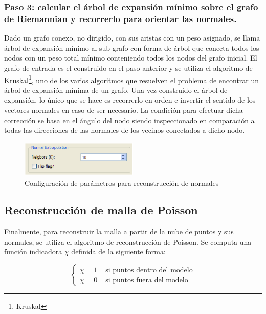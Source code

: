 \subsubsection{Paso 3: calcular el árbol de expansión mínimo sobre el grafo de Riemannian y recorrerlo para orientar las normales.}
Dado un grafo conexo, no dirigido, con sus aristas con un peso asignado, se llama árbol de expansión mínimo al sub-grafo con forma de árbol que conecta todos los nodos con un peso total mínimo conteniendo todos los nodos del grafo inicial. El grafo de entrada es el construido en el paso anterior y se utiliza el algoritmo de Kruskal\footnote{Kruskal}, uno de los varios algoritmos que resuelven el problema de encontrar un árbol de expansión mínima de un grafo.
Una vez construido el árbol de expansión, lo único que se hace es recorrerlo en orden e invertir el sentido de los vectores normales en caso de ser necesario. La condición para efectuar dicha corrección se basa en el ángulo del nodo siendo inspeccionado en comparación a todas las direcciones de las normales de los vecinos conectados a dicho nodo.

\begin{figure}[H]
  \centering
    \includegraphics[width=0.5\textwidth]{./Cap6_reconstruccion/malla-normalextrapolation.png}
  \caption{Configuración de parámetros para reconstrucción de normales}
  \label{fig:Mesh-Extrapolation}
\end{figure}

\subsection{Reconstrucción de malla de Poisson}

Finalmente, para reconstruir la malla a partir de la nube de puntos y sus normales, se utiliza el algoritmo de reconstrucción de Poisson.
Se computa una función indicadora $\chi$ definida de la siguiente forma:

$$
\left\{ \begin{array}{rl}
 \chi = 1 & \mbox{ si puntos dentro del modelo} \\
 \chi = 0 & \mbox{ si puntos fuera del modelo}
       \end{array} \right.
$$

